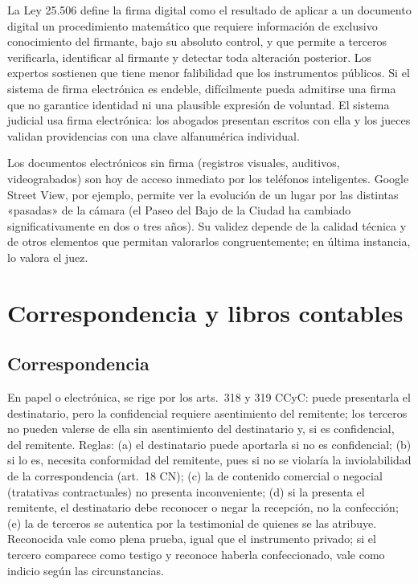 \documentclass[12pt,oneside]{book}
\begin{document}
La Ley 25.506 define la firma digital como el resultado de aplicar a un documento digital un procedimiento matemático que requiere información de exclusivo conocimiento del firmante, bajo su absoluto control, y que permite a terceros verificarla, identificar al firmante y detectar toda alteración posterior. Los expertos sostienen que tiene menor falibilidad que los instrumentos públicos. Si el sistema de firma electrónica es endeble, difícilmente pueda admitirse una firma que no garantice identidad ni una plausible expresión de voluntad. El sistema judicial usa firma electrónica: los abogados presentan escritos con ella y los jueces validan providencias con una clave alfanumérica individual.

Los documentos electrónicos sin firma (registros visuales, auditivos, videograbados) son hoy de acceso inmediato por los teléfonos inteligentes. Google Street View, por ejemplo, permite ver la evolución de un lugar por las distintas «pasadas» de la cámara (el Paseo del Bajo de la Ciudad ha cambiado significativamente en dos o tres años). Su validez depende de la calidad técnica y de otros elementos que permitan valorarlos congruentemente; en última instancia, lo valora el juez.

\section{Correspondencia y libros contables}

\subsection{Correspondencia}

En papel o electrónica, se rige por los arts.~318 y 319 CCyC: puede presentarla el destinatario, pero la confidencial requiere asentimiento del remitente; los terceros no pueden valerse de ella sin asentimiento del destinatario y, si es confidencial, del remitente. Reglas: (a) el destinatario puede aportarla si no es confidencial; (b) si lo es, necesita conformidad del remitente, pues si no se violaría la inviolabilidad de la correspondencia (art.~18 CN); (c) la de contenido comercial o negocial (tratativas contractuales) no presenta inconveniente; (d) si la presenta el remitente, el destinatario debe reconocer o negar la recepción, no la confección; (e) la de terceros se autentica por la testimonial de quienes se las atribuye. Reconocida vale como plena prueba, igual que el instrumento privado; si el tercero comparece como testigo y reconoce haberla confeccionado, vale como indicio según las circunstancias.
\end{document}
